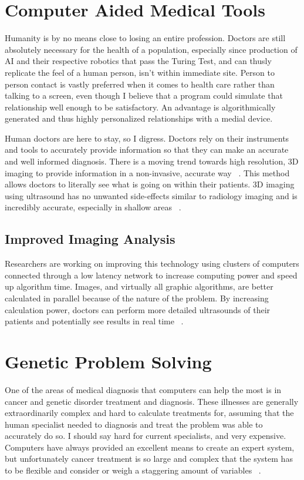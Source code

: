 \documentclass[11pt]{article}
\newcommand{\tab}{\hspace*{2em}}
\begin{document}
\begin{doublespace}
\section{Computer Aided Medical Tools}

\tab Humanity is by no means close to losing an entire profession. Doctors are still absolutely necessary for the health of 
a population, especially since production of AI and their respective robotics that pass the Turing Test, and can thusly replicate
the feel of a human person, isn't within immediate site. Person to person contact is vastly preferred when it comes to health
care rather than talking to a screen, even though I believe that a program could simulate that relationship well enough to be
satisfactory. An advantage is algorithmically generated and thus highly personalized relationships with a medial device.

\tab Human doctors are here to stay, so I digress. Doctors rely on their instruments and tools to accurately provide information
so that they can make an accurate and well informed diagnosis. There is a moving trend towards high resolution, 3D imaging to
provide information in a non-invasive, accurate way ~\cite{Zhang:2002:PPU:514191.514232}. This method allows doctors to 
literally see what is going on within their patients. 3D imaging using ultrasound has no unwanted side-effects similar to 
radiology imaging and is incredibly accurate, especially in shallow areas ~\cite{Zhang:2002:PPU:514191.514232}. 

\subsection{Improved Imaging Analysis}

\tab Researchers are working on improving this technology using clusters of computers connected through a low latency network
to increase computing power and speed up algorithm time. Images, and virtually all graphic algorithms, are better calculated
in parallel because of the nature of the problem. By increasing calculation power, doctors can perform more detailed ultrasounds
of their patients and potentially see results in real time ~\cite{Zhang:2002:PPU:514191.514232}. 

\section{Genetic Problem Solving}

\tab One of the areas of medical diagnosis that computers can help the most is in cancer and genetic disorder treatment and
diagnosis. These illnesses are generally extraordinarily complex and hard to calculate treatments for, assuming that the 
human specialist needed to diagnosis and treat the problem was able to accurately do so. I should say hard for current
specialists, and very expensive. Computers have always provided an excellent means to create an expert system, but unfortunately
cancer treatment is so large and complex that the system has to be flexible and consider or weigh a staggering amount of 
variables ~\cite{Wang:2012:RCM:2122263.2122454}.


\end{doublespace}
\end{document}
